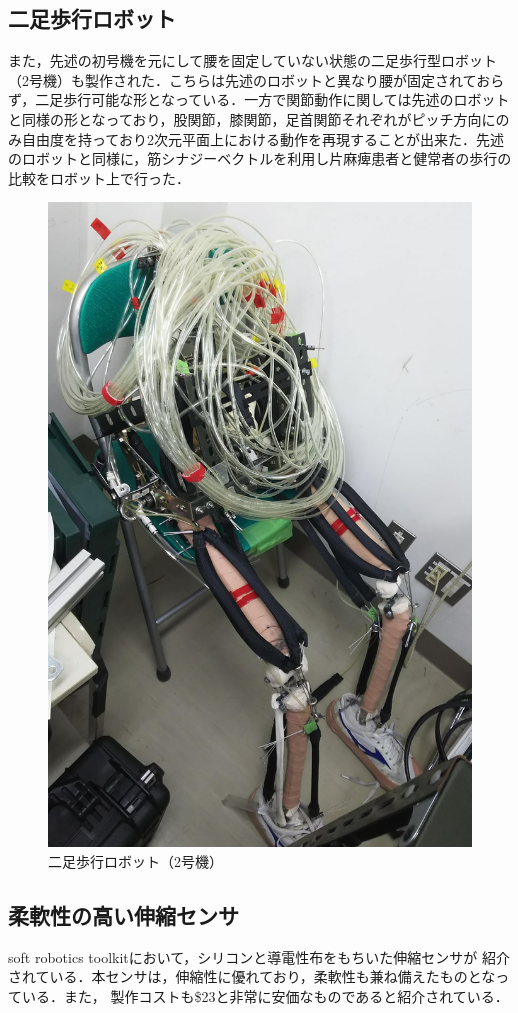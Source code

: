 \subsection{二足歩行ロボット}
また，先述の初号機を元にして腰を固定していない状態の二足歩行型ロボット（2号機）も製作された．こちらは先述のロボットと異なり腰が固定されておらず，二足歩行可能な形となっている．一方で関節動作に関しては先述のロボットと同様の形となっており，股関節，膝関節，足首関節それぞれがピッチ方向にのみ自由度を持っており2次元平面上における動作を再現することが出来た．先述のロボットと同様に，筋シナジーベクトルを利用し片麻痺患者と健常者の歩行の比較をロボット上で行った．
\begin{figure}[h]
  \begin{center}
  \includegraphics[width=0.35\columnwidth,clip]{Photo/BackGround/2nd.eps}
  \caption{二足歩行ロボット（2号機）}
  \label{2号機}
 \end{center}
\end{figure}

\subsection{柔軟性の高い伸縮センサ}%
soft robotics toolkit\cite{MITSoftRobot}において，シリコンと導電性布をもちいた伸縮センサが
紹介されている．本センサは，伸縮性に優れており，柔軟性も兼ね備えたものとなっている．また，
製作コストも\$23と非常に安価なものであると紹介されている．

